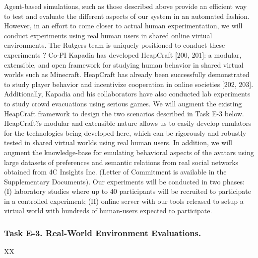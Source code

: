 Agent-based simulations, such as those described above provide an efficient way to test and evaluate the different aspects of our system in an automated fashion. However, in an effort to come closer to actual human experimentation, we will conduct experiments using real human users in shared online virtual environments. The Rutgers team is uniquely positioned to conduct these experiments ? Co-PI Kapadia has developed HeapCraft [200, 201]: a modular, extensible, and open framework for studying human behavior in shared virtual worlds such as Minecraft. HeapCraft has already been successfully demonstrated to study player behavior and incentivize cooperation in online societies [202, 203]. Additionally, Kapadia and his collaborators have also conducted lab experiments to study crowd evacuations using serious games.
We will augment the existing HeapCraft framework to design the two scenarios described in Task E-3 below. HeapCraft?s modular and extensible nature allows us to easily develop emulators for the technologies being developed here, which can be rigorously and robustly tested in shared virtual worlds using real human users. In addition, we will augment the knowledge-base for emulating behavioral aspects of the avatars using large datasets of preferences and semantic relations from real social networks obtained from 4C Insights Inc. (Letter of Commitment is available in the Supplementary Documents). 
Our experiments will be conducted in two phases: (I) laboratory studies where up to 40 participants will be recruited to participate in a controlled experiment; (II) online server with our tools released to setup a virtual world with hundreds of human-users  expected to participate. 


\subsubsection{Task E-3. Real-World Environment Evaluations.  }

XX

